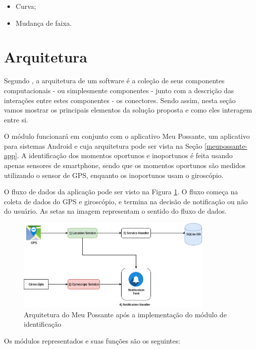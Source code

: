 \begin{itemize}
  \item Curva;
  \item Mudança de faixa.
\end{itemize}

\section{Arquitetura}
\label{sec-arquitetura-solucao}
Segundo , a arquitetura de um software é a coleção de seus componentes computacionais - ou simplesmente
componentes - junto com a descrição das interações entre estes componentes - os conectores. Sendo assim, nesta seção
vamos mostrar os principais elementos da solução proposta e como eles interagem entre si.

O módulo funcionará em conjunto com o aplicativo Meu Possante, um aplicativo para sistemas Android e cuja arquitetura pode ser vista
na Seção \ref{meupossante-app}. A identificação dos momentos oportunos e inoportunos é feita usando apenas sensores de smartphone,
sendo que os momentos oportunos são medidos utilizando o sensor de GPS, enquanto os inoportunos usam o giroscópio.

O fluxo de dados da aplicação pode ser visto na Figura \ref{arquitetura-meu-possante-com-modulo}. O fluxo começa
na coleta de dados do GPS e giroscópio, e termina na decisão de notificação ou não do usuário. As setas na
imagem representam o sentido do fluxo de dados.

\begin{figure}[h]
\centering
\includegraphics[width=0.85\textwidth]{images/arquitetura-meu-possante-com-modulo.png}
\caption{Arquitetura do Meu Possante após a implementação do módulo de identificação}
\label{arquitetura-meu-possante-com-modulo}
\end{figure}

Os módulos representados e suas funções são os seguintes:

